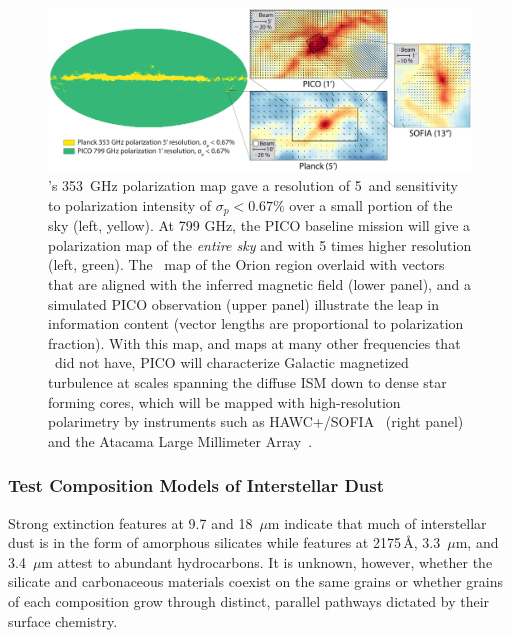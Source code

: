 \documentclass[PICOReport.tex]{subfiles}
\begin{document}
\begin{figure}
    \centering
    \includegraphics[width=6.5in]{galsci_fig_v4.pdf}
    \caption{\captiontext  \planck 's 353~GHz polarization map gave a resolution of 5\arcmin~and sensitivity to polarization intensity of $\sigma_{p} < 0.67\%$ over a small portion of the sky (left, yellow).  At 799 GHz, the PICO baseline mission will give a polarization map of the {\it entire sky} and with 5 times higher resolution (left, green). The \planck~map of the Orion region overlaid with vectors that are aligned with the inferred magnetic field (lower panel), and a simulated PICO observation (upper panel) illustrate the leap in information content (vector lengths are proportional to polarization fraction). With this map, and maps at many other frequencies that \planck~did not have, PICO will characterize Galactic magnetized turbulence at scales spanning the diffuse ISM down to dense star forming cores, which will be mapped with high-resolution polarimetry by instruments such as HAWC+/SOFIA~\citep{Chuss2018} (right panel) and the Atacama Large Millimeter Array~\citep{Bacciotti2018ApJ}.}
    \label{fig:allsky}
\end{figure}

\subsubsection{Test Composition Models of Interstellar Dust}
\label{sec:test_composition_models}

Strong extinction features at 9.7 and 18~$\mu$m indicate that much of interstellar dust is in the form of amorphous silicates while features at 2175\,\AA, 3.3~$\mu$m, and 3.4~$\mu$m attest to abundant hydrocarbons. It is unknown, however, whether the silicate and carbonaceous materials coexist on the same grains or whether grains of each composition grow through distinct, parallel pathways dictated by their surface chemistry. 
\end{document}
